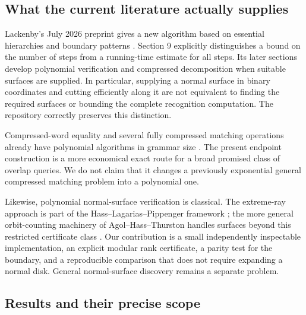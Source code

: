 \subsection{What the current literature actually supplies}

Lackenby's July 2026 preprint gives a new algorithm based on essential
hierarchies and boundary patterns \cite{lackenby2026}. Section 9 explicitly
distinguishes a bound on the number of steps from a running-time estimate for
all steps. Its later sections develop polynomial verification and compressed
decomposition when suitable surfaces are supplied. In particular, supplying
a normal surface in binary coordinates and cutting efficiently along it are
not equivalent to finding the required surfaces or bounding the complete
recognition computation. The repository correctly preserves this distinction.

Compressed-word equality and several fully compressed matching operations
already have polynomial algorithms in grammar size
\cite{schleimer,lifshits,matsubara}. The present endpoint construction is a
more economical exact route for a broad promised class of overlap queries.
We do not claim that it changes a previously exponential general compressed
matching problem into a polynomial one.

Likewise, polynomial normal-surface verification is classical. The
extreme-ray approach is part of the Hass--Lagarias--Pippenger framework
\cite{hlp}; the more general orbit-counting machinery of
Agol--Hass--Thurston handles surfaces beyond this restricted certificate
class \cite{aht}. Our contribution is a small independently inspectable
implementation, an explicit modular rank certificate, a parity test for the
boundary, and a reproducible comparison that does not require expanding a
normal disk. General normal-surface discovery remains a separate problem.

\subsection{Results and their precise scope}

